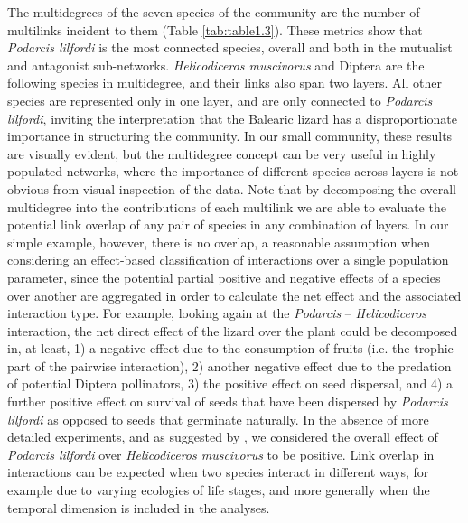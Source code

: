 The multidegrees of the seven species of the community are the number of multilinks incident to them (Table \ref{tab:table1.3}). These metrics show that \textit{Podarcis lilfordi} is the most connected species, overall and both in the mutualist and antagonist sub-networks. \textit{Helicodiceros muscivorus} and Diptera are the following species in multidegree, and their links also span two layers. All other species are represented only in one layer, and are only connected to \textit{Podarcis lilfordi}, inviting the interpretation that the Balearic lizard has a disproportionate importance in structuring the community. In our small community, these results are visually evident, but the multidegree concept can be very useful in highly populated networks, where the importance of different species across layers is not obvious from visual inspection of the data. Note that by decomposing the overall multidegree into the contributions of each multilink we are able to evaluate the potential link overlap of any pair of species in any combination of layers. In our simple example, however, there is no overlap, a reasonable assumption when considering an effect-based classification of interactions over a single population parameter, since the potential partial positive and negative effects of a species over another are aggregated in order to calculate the net effect and the associated interaction type. For example, looking again at the \textit{Podarcis} -- \textit{Helicodiceros} interaction, the net direct effect of the lizard over the plant could be decomposed in, at least, 1) a negative effect due to the consumption of fruits (i.e. the trophic part of the pairwise interaction), 2) another negative effect due to the predation of potential Diptera pollinators, 3) the positive effect on seed dispersal, and 4) a further positive effect on survival of seeds that have been dispersed by \textit{Podarcis lilfordi} as opposed to seeds that germinate naturally. In the absence of more detailed experiments, and as suggested by \cite{Perez-Mellado2006}, we considered the overall effect of \textit{Podarcis lilfordi} over \textit{Helicodiceros muscivorus} to be positive. Link overlap in interactions can be expected when two species interact in different ways, for example due to varying ecologies of life stages, and more generally when the temporal dimension is included in the analyses.

